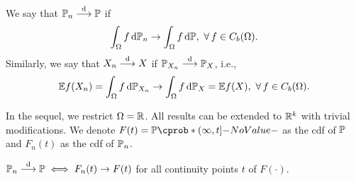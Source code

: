 \documentclass[12pt]{article}
\begin{document}
%
\begin{Definition}\label{wk9:def:weak convergence}
We say that $\P_n \convd \P$ if 
\begin{align*}
\int_{\Omega} f \ud\P_n \to \int_{\Omega} f \ud\P,\ \forall f \in C_b(\Omega).
\end{align*}
Similarly, we say that $X_n \stackrel{\mathrm{d}}{\longrightarrow} X$ if $\P_{X_n} \convd \P_X$, i.e., 
\begin{align*}
\E f(X_n) = \int_{\Omega} f \ud\P_{X_n} 
\to 
\int_{\Omega} f \ud\P_X = \E f(X), \ \forall f \in C_b(\Omega).
\end{align*}
\end{Definition}

In the sequel, we restrict $\Omega = \mathbb{R}$. All results can be extended to $\mathbb{R}^k$ with trivial modifications. We denote $F(t) = \P({\left(\infty, t\right]})$ as the cdf of $\P$ and $F_n(t)$ as the cdf of $\P_n$.
%
\begin{Theorem} \label{wk9:thm:convd_iff_conv_in_cdf}
$\P_n \convd \P \iff F_n(t) \to F(t)$ for all continuity points $t$ of $F(\cdot)$.
\end{Theorem}
%
\end{document}
